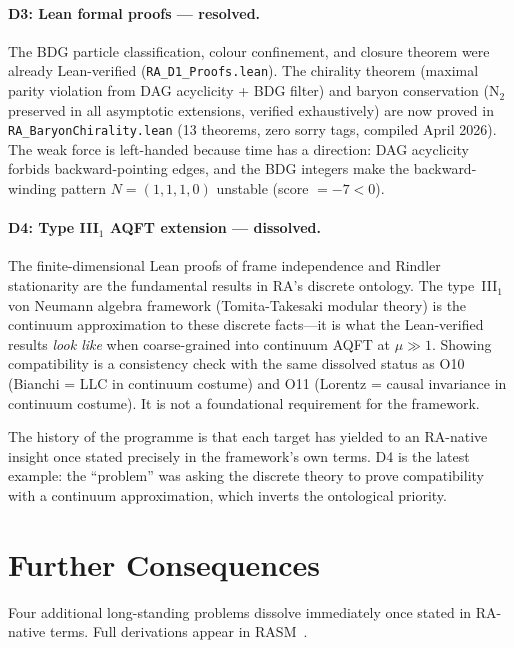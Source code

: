 \documentclass[11pt,a4paper]{article}
\begin{document}
\paragraph{D3: Lean formal proofs --- resolved.}
The BDG particle classification, colour confinement, and closure theorem
were already Lean-verified (\texttt{RA\_D1\_Proofs.lean}).
The chirality theorem (maximal parity violation from DAG acyclicity +
BDG filter) and baryon conservation (N$_2$ preserved in all asymptotic
extensions, verified exhaustively) are now proved in
\texttt{RA\_BaryonChirality.lean} (13 theorems, zero sorry tags,
compiled April 2026). The weak force is left-handed because time has a
direction: DAG acyclicity forbids backward-pointing edges, and the BDG
integers make the backward-winding pattern $N=(1,1,1,0)$ unstable
(score $= -7 < 0$).

\paragraph{D4: Type III$_1$ AQFT extension --- dissolved.}
The finite-dimensional Lean proofs of frame independence and Rindler
stationarity are the fundamental results in RA's discrete ontology.
The type~III$_1$ von Neumann algebra framework (Tomita-Takesaki modular
theory) is the continuum approximation to these discrete facts---it is
what the Lean-verified results \emph{look like} when coarse-grained
into continuum AQFT at $\mu \gg 1$. Showing compatibility is a
consistency check with the same dissolved status as O10 (Bianchi = LLC
in continuum costume) and O11 (Lorentz = causal invariance in continuum
costume). It is not a foundational requirement for the framework.

The history of the programme is that each target has yielded to an
RA-native insight once stated precisely in the framework's own terms.
D4 is the latest example: the ``problem'' was asking the discrete
theory to prove compatibility with a continuum approximation, which
inverts the ontological priority.

\section{Further Consequences}
\label{sec:further_consequences}

Four additional long-standing problems dissolve immediately once stated
in RA-native terms. Full derivations appear in RASM~\citep{Sandeman2026RASM}.
\end{document}

